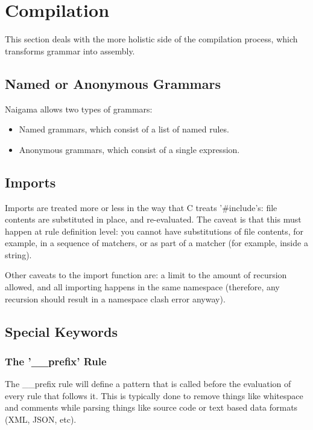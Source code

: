 \section{Compilation}

This section deals with the more holistic side of the compilation process,
which transforms grammar into assembly.

\subsection{Named or Anonymous Grammars}

Naigama allows two types of grammars:

\begin{itemize}
\item Named grammars, which consist of a list of named rules.
\item Anonymous grammars, which consist of a single expression.
\end{itemize}

\subsection{Imports}

Imports are treated more or less in the way that C treats '\#include's:
file contents are substituted in place, and re-evaluated. The caveat
is that this must happen at rule definition level: you cannot have
substitutions of file contents, for example, in a sequence of matchers,
or as part of a matcher (for example, inside a string).

Other caveats to the import function are: a limit to the amount of
recursion allowed, and all importing happens in the same namespace
(therefore, any recursion should result in a namespace clash error
anyway).

\subsection{Special Keywords}

\subsubsection{The '\_\_prefix' Rule}

The \_\_prefix rule will define a pattern that is called before
the evaluation of every rule that follows it. This is typically
done to remove things like whitespace and comments while parsing
things like source code or text based data formats (XML, JSON, etc).


